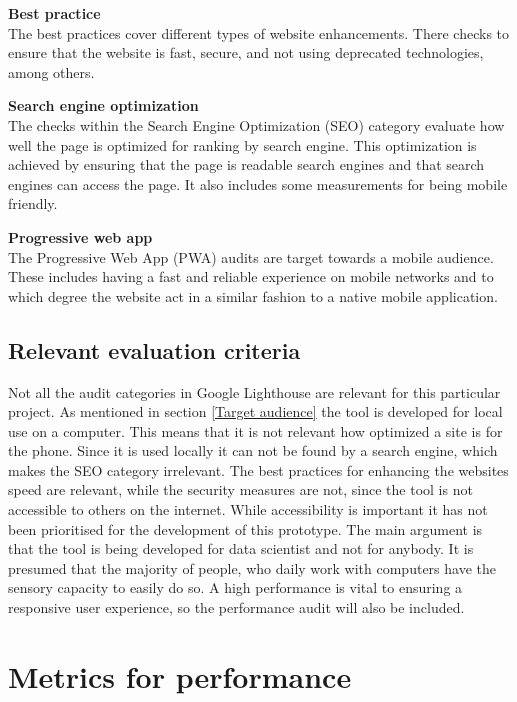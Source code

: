 \textbf{Best practice}\\
The best practices cover different types of website enhancements. There checks to ensure that the website is fast, secure, and not using deprecated technologies, among others. \citep{LhBP}

\textbf{Search engine optimization}\\
The checks within the Search Engine Optimization (SEO) category evaluate how well the page is optimized for ranking by search engine. This optimization is achieved by ensuring that the page is readable search engines and that search engines can access the page. It also includes some measurements for being mobile friendly.
\citep{LhSEO}

\textbf{Progressive web app}\\
The Progressive Web App (PWA) audits are target towards a mobile audience. These includes having a fast and reliable experience on mobile networks and to which degree the website act in a similar fashion to a native mobile application.
\citep{LhPWA}

\subsection{Relevant evaluation criteria}
 
Not all the audit categories in Google Lighthouse are relevant for this particular project. As mentioned in section \ref{Target audience}  the tool is developed for local use on a computer. This means that it is not relevant how optimized a site is for the phone. Since it is used locally it can not be found by a search engine, which makes the SEO category irrelevant. The best practices for enhancing the websites speed are relevant, while the security measures are not, since the tool is not accessible to others on the internet. While accessibility is important it has not been prioritised for the development of this prototype. The main argument is that the tool is being developed for data scientist and not for anybody. It is presumed that the majority of people, who daily work with computers have the sensory capacity to easily do so. A high performance is vital to ensuring a responsive user experience, so the performance audit will also be included.



\section{Metrics for performance}

